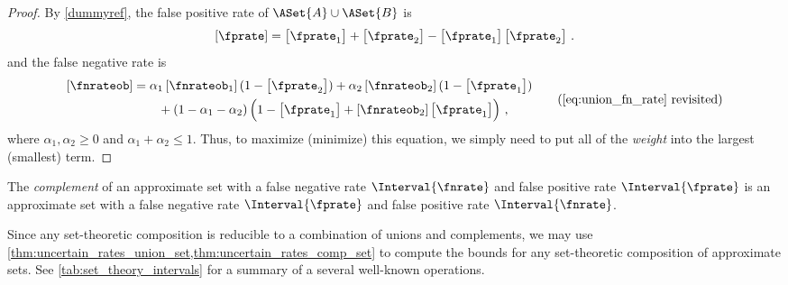 \documentclass[ ../main.tex]{subfiles}
\begin{document}
\begin{proof}
	By \cref{dummyref}, the false positive rate of $\ASet{A} \cup \ASet{B}$ is
	\begin{equation}
	\left[\fprate\right] = \left[\fprate_1\right] + \left[\fprate_2\right] - 
	\left[\fprate_1\right] \left[\fprate_2\right]\,.
	\end{equation}
	and the false negative rate is
	\begin{equation*}
	\begin{split}
	\left[\fnrateob\right] &=
	\alpha_1 \left[\fnrateob_1\right](1 - \left[\fprate_2\right]) + 
	\alpha_2 \left[\fnrateob_2\right] (1 - \left[\fprate_1\right])\\
	&\qquad+ (1 - \alpha_1 - \alpha_2) \left(1 - \left[\fprate_1\right] + 
	\left[\fnrateob_2\right] \left[\fprate_1\right]\right)\,,
	\end{split}
	\tag{\ref{eq:union_fn_rate} revisited}
	\end{equation*}
	where $\alpha_1,\alpha_2 \geq 0$ and $\alpha_1 + \alpha_2 \leq 1$. Thus, to 
	maximize (minimize) this equation, we simply need to put all of the 
	\emph{weight} into the largest (smallest) term.
\end{proof}


\begin{theorem}
	\label{thm:uncertain_rates_comp_set}
	The \emph{complement} of an approximate set with a false negative rate $\Interval{\fnrate}$ and false positive rate $\Interval{\fprate}$ is an approximate set 
	with a false negative rate $\Interval{\fprate}$ and false positive rate $\Interval{\fnrate}$.
\end{theorem}

Since any set-theoretic composition is reducible to a combination of unions and 
complements, we may use 
\cref{thm:uncertain_rates_union_set,thm:uncertain_rates_comp_set} to compute 
the bounds for any set-theoretic composition of approximate sets. See 
\cref{tab:set_theory_intervals} for a summary of a several well-known 
operations.
\end{document}
